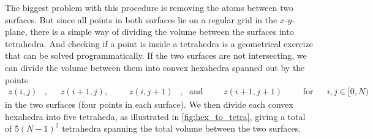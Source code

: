 The biggest problem with this procedure is removing the atoms between two surfaces. But since all points in both surfaces lie on a regular grid in the $x$-$y$-plane, there is a simple way of dividing the volume between the surfaces into tetrahedra. And checking if a point is inside a tetrahedra is a geometrical exercize that can be solved programmatically. If the two surfaces are not intersecting, we can divide the volume between them into convex hexahedra spanned out by the points
\begin{align*}
    z(i,j)&, & &z(i+1,j),& & &z(i,j+1)&, &\text{and}& & &z(i+1,j+1)& & &\text{for} & &i,j \in [0,N)
\end{align*}
in the two surfaces (four points in each surface). We then divide each convex hexahedra into five tetraheda, as illustrated in \cref{fig:hex_to_tetra}, giving a total of $5(N-1)^2$ tetrahedra spanning the total volume between the two surfaces.
%
%
%

